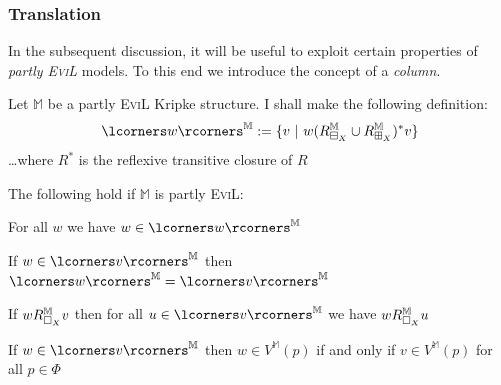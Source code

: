 %
\subsubsection{Translation}

In the subsequent discussion, it will be useful to exploit certain properties of \emph{partly \textsc{EviL}} models.  To this end we introduce the concept of a \emph{column}.

\begin{mydef}Let $\mathbb{M}$ be a partly \textsc{EviL} Kripke structure.  I shall make the following definition:
\[ \lcorners w\rcorners^\mathbb{M} := \{ v\ |\ w (R^{\mathbb{M}}_{\BB_X}\cup R^{\mathbb{M}}_{\BBI_X})^\ast v \}\]
\ldots where $R^\ast$ is the reflexive transitive closure of $R$
\end{mydef}

\begin{lemma}\label{column}
The following hold if $\mathbb{M}$ is partly \textsc{EviL}:
\begin{mynum}
	\item For all $w$ we have $w \in \lcorners w\rcorners^\mathbb{M}$
	\item If $w \in \lcorners v\rcorners^\mathbb{M}$ then $\lcorners w\rcorners^\mathbb{M} = \lcorners v\rcorners^\mathbb{M}$
	\item If $w R^\mathbb{M}_{\Box_X} v$ then for all $u \in \lcorners v\rcorners^\mathbb{M}$ we have $w R^\mathbb{M}_{\Box_X} u$
	\item If $w \in \lcorners v\rcorners^\mathbb{M}$ then $w\in V^\mathbb{M}(p)$ if and only if $v \in V^\mathbb{M}(p)$ for all $p \in \Phi$
\end{mynum}

\end{lemma}

